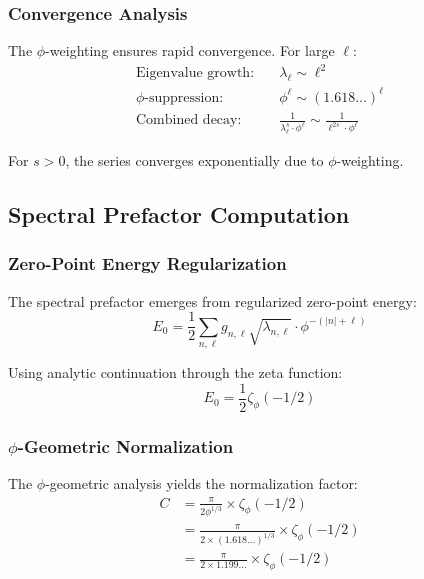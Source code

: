 \subsubsection{Convergence Analysis}

The $\phi$-weighting ensures rapid convergence. For large $\ell$:
\begin{align}
\text{Eigenvalue growth:} &\quad \lambda_\ell \sim \ell^2\\
\text{$\phi$-suppression:} &\quad \phi^\ell \sim (1.618...)^\ell\\
\text{Combined decay:} &\quad \frac{1}{\lambda_\ell^s \cdot \phi^\ell} \sim \frac{1}{\ell^{2s} \cdot \phi^\ell}
\end{align}

For $s > 0$, the series converges exponentially due to $\phi$-weighting.

\subsection{Spectral Prefactor Computation}

\subsubsection{Zero-Point Energy Regularization}

The spectral prefactor emerges from regularized zero-point energy:
\begin{equation}
E_0 = \frac{1}{2} \sum_{n,\ell} g_{n,\ell} \sqrt{\lambda_{n,\ell}} \cdot \phi^{-(|n|+\ell)}
\end{equation}

Using analytic continuation through the zeta function:
\begin{equation}
E_0 = \frac{1}{2} \zeta_\phi(-1/2)
\end{equation}

\subsubsection{$\phi$-Geometric Normalization}

The $\phi$-geometric analysis yields the normalization factor:
\begin{align}
C &= \frac{\pi}{2\phi^{1/3}} \times \zeta_\phi(-1/2)\\
&= \frac{\pi}{2 \times (1.618...)^{1/3}} \times \zeta_\phi(-1/2)\\
&= \frac{\pi}{2 \times 1.199...} \times \zeta_\phi(-1/2)
\end{align}

